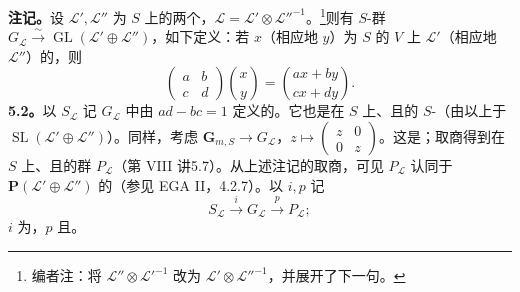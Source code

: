 \textbf{注记。}设 $\mathscr L',\mathscr L''$ 为 $S$ 上的两个，$\mathscr L=\mathscr L'\otimes\mathscr L''^{-1}$。\footnote{编者注：将 $\mathscr L''\otimes\mathscr L'^{-1}$ 改为 $\mathscr L'\otimes\mathscr L''^{-1}$，并展开了下一句。}则有 $S$-群 $G_{\mathscr L}\xrightarrow\sim\operatorname{GL}(\mathscr L'\oplus\mathscr L'')$，如下定义：若 $x$（相应地 $y$）为 $S$ 的 $V$ 上 $\mathscr L'$（相应地 $\mathscr L''$）的，则
\[\begin{pmatrix}a&b\\c&d\end{pmatrix}\binom xy=\binom{ax+by}{cx+dy}.\]
\textbf{5.2。}以 $S_{\mathscr L}$ 记 $G_{\mathscr L}$ 中由 $ad-bc=1$ 定义的。它也是在 $S$ 上、且的 $S$-（由以上于 $\operatorname{SL}(\mathscr L'\oplus\mathscr L'')$）。同样，考虑 $\mathbf G_{m,S}\to G_{\mathscr L}$，$z\mapsto\left(\begin{smallmatrix}z&0\\0&z\end{smallmatrix}\right)$。这是；取商得到在 $S$ 上、且的群 $P_{\mathscr L}$（第 VIII 讲5.7）。从上述注记的取商，可见 $P_{\mathscr L}$ 认同于 $\mathbf P(\mathscr L'\oplus\mathscr L'')$ 的（参见 EGA II，4.2.7）。以 $i,p$ 记
\[S_{\mathscr L}\xrightarrow iG_{\mathscr L}\xrightarrow pP_{\mathscr L};\]
$i$ 为，$p$ 且。

